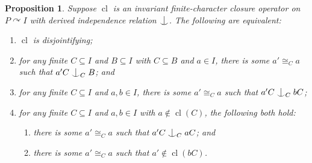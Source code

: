 \documentclass[10pt,a4paper]{amsart}
\newtheorem{proposition}{Proposition}
\DeclareMathOperator{\cl}{cl}
\newcommand{\forkindep}[1][]{%
  \mathrel{
    \mathop{
      \vcenter{
        \hbox{\oalign{\noalign{\kern-.3ex}\hfil$\vert$\hfil\cr
              \noalign{\kern-.7ex}
              $\smile$\cr\noalign{\kern-.3ex}}}
      }
    }\displaylimits_{#1}
  }
}
\newcommand{\isom}{\cong}
\begin{document}
\begin{proposition}\label{prop:cl_equivalence}
Suppose $\cl$ is an invariant finite-character closure operator on $P \curvearrowright I$ with derived independence relation $\forkindep$. The following are equivalent:
\begin{enumerate}
    \item $\cl$ is disjointifying;
    \item for any finite $C \subseteq I$ and $B \subseteq I$ with $C \subseteq B$ and $a \in I$, there is some $a' \isom_C a$ such that $a'C \forkindep[C] B$; and
    \item for any finite $C \subseteq I$ and $a, b \in I$, there is some $a' \isom_C a$ such that $a'C \forkindep[C] bC$;
    \item for any finite $C \subseteq I$ and $a, b \in I$ with $a \not\in \cl(C)$, the following both hold:
    \begin{enumerate}
        \item there is some $a' \isom_C a$ such that $a'C \forkindep[C] aC$; and
        \item there is some $a' \isom_C a$ such that $a' \not\in \cl(bC)$.
    \end{enumerate}
\end{enumerate}

\end{proposition}
\end{document}
